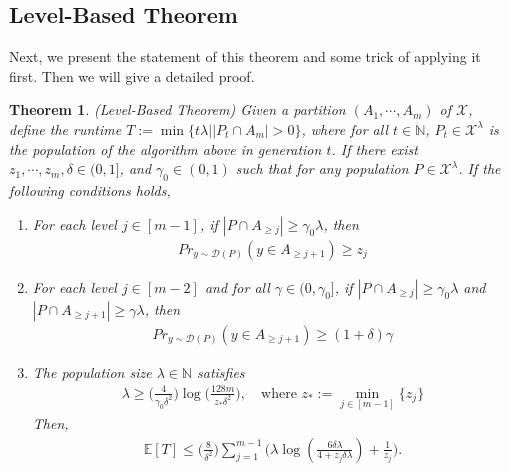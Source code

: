 \documentclass[a4paper,11pt]{report}
\theoremstyle{plain} %
\newtheorem{thm}{Theorem}[section]
\theoremstyle{definition} %
\theoremstyle{remark} %
\begin{document}
\subsection{Level-Based Theorem}
\par Next, we present the statement of this theorem and some trick of applying it first. Then we will give a detailed proof.

\begin{thm}(Level-Based Theorem) Given a partition $(A_{1}, \cdots ,A_{m})$ of $\mathcal{X}$, define the runtime $T:=\min \{ t \lambda |   |P_{t} \cap A_{m}|>0 \}$, where for all $t\in \mathbb{N}$, $P_{t} \in \mathcal{X}^{\lambda}$ is the population of the algorithm above in generation $t$. If there exist $z_{1},\cdots ,z_{m}, \delta \in (0,1]$, and $\gamma_{0} \in (0,1)$ such that for any population $P \in \mathcal{X}^{\lambda}$. If the following conditions holds,
\begin{enumerate}[(G1)]
    \item For each level $j\in [m-1]$, if $|P \cap A_{\geq j}| \geq \gamma_{0}\lambda$, then 
    \begin{align*}
        Pr_{y \sim \mathcal{D}(P)}( y \in A_{\geq j+1}) \geq z_{j}
    \end{align*}
    
    \item For each level $j\in [m-2]$ and for all $\gamma \in (0,\gamma_{0}]$, if $|P \cap A_{\geq j}| \geq \gamma_{0}\lambda$ and $|P \cap A_{\geq j+1}| \geq \gamma \lambda$, then 
    \begin{align*}
        Pr_{y \sim \mathcal{D}(P)}( y \in A_{\geq j+1}) \geq (1+\delta )\gamma
    \end{align*}
       
    \item The population size $\lambda \in \mathbb{N}$ satisfies
    \begin{align*}
        \lambda \geq \big(\frac{4}{\gamma_{0} \delta ^2}  \big) \log \big(\frac{128m}{z_{*}\delta ^2 } \big), \quad \text{where $z_{*}:=\min_{j \in [m-1]}\{z_{j}\}$}
    \end{align*}
    Then, 
    \begin{align*}
        \mathbb{E}[T] \leq \big(\frac{8}{\delta ^2} \big)\sum_{j=1}^{m-1} \big( \lambda \log (\frac{6\delta \lambda}{4+z_{j}\delta \lambda }) + \frac{1}{z_{j}} \big).
    \end{align*}
\end{enumerate}
\end{thm}
\end{document}
